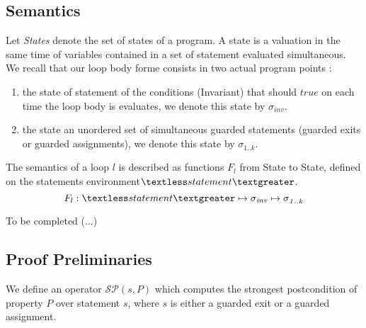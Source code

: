 \documentclass[a4paper,10pt]{article}
\newcommand{\state}[1]{\ensuremath{\sigma_{\mathit{#1}}\xspace}}
\newcommand{\vstate}[2]{\ensuremath{\sigma^{\mathit{#1}}_{\mathit{#2}}\xspace}}
\begin{document}
\subsection*{Semantics}
Let \emph{States} denote the set of states of a program. A state is a valuation 
in the same time of variables contained in a set of statement evaluated simultaneous.
We recall that our loop body forme consists in two actual program points :
\begin{enumerate}
 \item the state of statement of the conditions (Invariant) that should $\mathit{true}$ 
on each time the loop body is evaluates, we denote this state by \state{inv}.
 \item the state an unordered set of simultaneous guarded statements
(guarded exits or guarded assignments), we denote this state by \vstate{}{1..k}.
\end{enumerate}
The semantics of a loop $l$ is described as functions $F_l$ from State to State,
defined on the statements environment$\textless statement \textgreater$.
$$F_l: \textless statement \textgreater \mapsto \state{inv} \mapsto \vstate{}{1..k}$$

To be completed (...)

\subsection{Proof Preliminaries}

\newcommand{\spostsym}{\ensuremath{\mathcal{SP}}\xspace}
\newcommand{\spost}[2]{\ensuremath{\spostsym(#1,#2)}}
\newcommand{\subst}[3]{\ensuremath{#1[#2 \leftarrow #3]}}

We define an operator \spost{s}{P} which computes the strongest postcondition of
property $P$ over statement $s$, where $s$ is either a guarded
exit or a guarded assignment.
\end{document}
